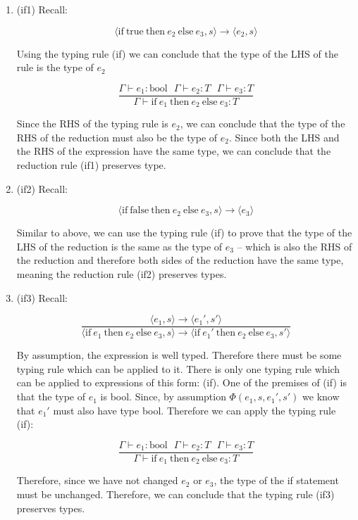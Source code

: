 \documentclass[10pt,\jkfside,a4paper]{article}
\begin{document}
\begin{enumerate}
\begin{enumerate}[label=\textbf{Case}]
\item (if1) Recall:

\[
\langle \text{if} \ \text{true} \ \text{then} \ e_2 \ \text{else} \ e_3, s
\rangle \to \langle e_2, s \rangle
\]

Using the typing rule (if) we can conclude that the type of the LHS of the
rule is the type of $e_2$

\[
\dfrac{\Gamma \vdash e_1: \text{bool} \ \ \ \Gamma \vdash e_2: T \ \ \ \Gamma
\vdash e_3: T}{ \Gamma \vdash \text{if} \ e_1 \ \text{then} \ e_2 \
\text{else} \ e_3: T }
\]

Since the RHS of the typing rule is $e_2$, we can conclude that the type of
the RHS of the reduction must also be the type of $e_2$. Since both the LHS
and the RHS of the expression have the same type, we can conclude that the
reduction rule (if1) preserves type.

\item (if2) Recall:

\[
\langle \text{if} \ \text{false} \ \text{then} \ e_2 \ \text{else} \ e_3, s
\rangle \to \langle e_3 \rangle
\]

Similar to above, we can use the typing rule (if) to prove that the type
of the LHS of the reduction is the same as the type of $e_3$ -- which is
also the RHS of the reduction and therefore both sides of the reduction have
the same type, meaning the reduction rule (if2) preserves types.

\item (if3) Recall:

\[
\dfrac{
\langle e_1, s \rangle \to \langle e_1', s' \rangle
}
{
\langle \text{if} \ e_1 \ \text{then} \ e_2 \ \text{else} \ e_3, s \rangle
\to
\langle \text{if} \ e_1' \ \text{then} \ e_2 \ \text{else} \ e_3, s' \rangle
}
\]

By assumption, the expression is well typed. Therefore there must be some
typing rule which can be applied to it. There is only one typing rule which
can be applied to expressions of this form: (if). One of the premises of
(if) is that the type of $e_1$ is bool. Since, by assumption $\Phi(e_1, s,
e_1', s')$ we know that $e_1'$ must also have type bool. Therefore we can
apply the typing rule (if):

\[
\dfrac{\Gamma \vdash e_1: \text{bool} \ \ \ \Gamma\vdash e_2: T \ \ \ \Gamma\vdash e_3: T}
{
\Gamma \vdash \text{if} \ e_1 \ \text{then} \ e_2 \ \text{else} \ e_3: T
}
\]

Therefore, since we have not changed $e_2$ or $e_3$, the type of the if
statement must be unchanged. Therefore, we can conclude that the typing rule
(if3) preserves types.


\end{enumerate}
\end{enumerate}
\end{document}
